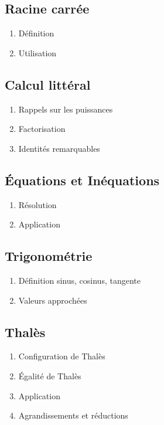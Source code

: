 \subsection{Racine carrée}\label{ch_3_rac}

\begin{enumerate}
	\item Définition
	\item Utilisation
\end{enumerate}

\subsection{Calcul littéral}\label{ch_3_lit}

\begin{enumerate}
	\item Rappels sur les puissances
	\item Factorisation
	\item Identités remarquables
\end{enumerate}

\subsection{\'Equations et Inéquations}\label{ch_3_eq}

\begin{enumerate}
	\item Résolution
	\item Application
\end{enumerate}

\subsection{Trigonométrie}\label{ch_3_trigo}

\begin{enumerate}
	\item Définition sinus, cosinus, tangente
	\item Valeurs approchées
\end{enumerate}

\subsection{Thalès}\label{ch_3_thales}

\begin{enumerate}
	\item Configuration de Thalès
	\item \'Egalité de Thalès
	\item Application
	\item Agrandissements et réductions
	
\end{enumerate}

